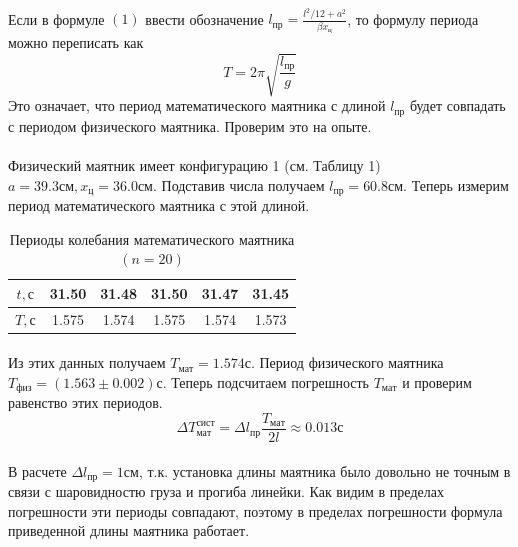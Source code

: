 \documentclass[a4paper, 12pt]{article}
\begin{document}
    \paragraph{}
    Если в формуле $(1)$ ввести обозначение $l_{пр}=\frac{l^{2}/{12}+a^{2}}{\beta x_ц}$, то формулу периода можно переписать как
    \[T=2\pi\sqrt{\frac{l_{пр}}{g}}\]
    Это означает, что период математического маятника с длиной $l_{пр}$ будет совпадать с периодом физического маятника. Проверим это на опыте.
    \paragraph{}
    Физический маятник имеет конфигурацию 1 (см. Таблицу 1) \newline $a=39.3см,x_ц=36.0см$. Подставив числа получаем $l_{пр}=60.8см$. Теперь измерим период математического маятника с этой длиной.

    \begin{table}[h!]
        \begin{center}

         \begin{tabular}{|c|c|c|c|c|c|}
            \hline
            \textbf{$t, с$} & 31.50 & 31.48 & 31.50 & 31.47 & 31.45\\
            \hline
            \textbf{$T,с$} & 1.575 & 1.574 & 1.575 & 1.574 & 1.573\\
            \hline
         \end{tabular}
         \caption{Периоды колебания математического маятника $(n=20)$}
        \end{center}

    \end{table}
    \paragraph{}
    Из этих данных получаем ${T_{мат}}=1.574с$. Период физического маятника $T_{физ}=(1.563\pm0.002)с$. Теперь подсчитаем погрешность $T_{мат}$ и проверим равенство этих периодов.
    \[\Delta  T_{мат}^{сист} = \Delta l_{пр}\frac{T_{мат}}{2l} \approx 0.013с\]
    \paragraph{}
    В расчете $\Delta l_{пр}=1см$, т.к. установка длины маятника было довольно не точным в связи с шаровидностю груза и прогиба линейки. Как видим в пределах погрешности эти периоды совпадают, поэтому в пределах погрешности формула приведенной длины маятника работает.
\end{document}
